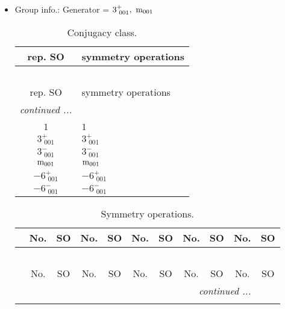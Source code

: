\documentclass[fleqn,10pt,landscape]{article}
\begin{document}
\begin{itemize}
\item Group info.: Generator = $3^{+}_{\,\,001},\,\,{\rm m}_{001}$

\begin{center}
\renewcommand{\arraystretch}{1.3}
\begin{longtable}{c|l}
\caption{Conjugacy class.}
 \\
 \hline \hline
rep. SO & symmetry operations \\ \hline \endfirsthead

\multicolumn{1}{l}{\tablename\ \thetable{}} \\
 \hline \hline
rep. SO & symmetry operations \\ \hline \endhead

 \hline \hline
\multicolumn{1}{r}{\footnotesize\it continued ...} \\ \endfoot

 \hline \hline
\multicolumn{1}{r}{} \\ \endlastfoot

$1$ & $1$ \\ \hline
$3^{+}_{\,\,001}$ & $3^{+}_{\,\,001}$ \\ \hline
$3^{-}_{\,\,001}$ & $3^{-}_{\,\,001}$ \\ \hline
${\rm m}_{001}$ & ${\rm m}_{001}$ \\ \hline
$-6^{+}_{\,\,001}$ & $-6^{+}_{\,\,001}$ \\ \hline
$-6^{-}_{\,\,001}$ & $-6^{-}_{\,\,001}$ \\
\end{longtable}
\end{center}
\begin{center}
\renewcommand{\arraystretch}{1.3}
\begin{longtable}{c|cc|cc|cc|cc|cc}
\caption{Symmetry operations.}
 \\
 \hline \hline
 & No. & SO & No. & SO & No. & SO & No. & SO & No. & SO \\ \hline \endfirsthead

\multicolumn{10}{l}{\tablename\ \thetable{}} \\
 \hline \hline
 & No. & SO & No. & SO & No. & SO & No. & SO & No. & SO \\ \hline \endhead

 \hline \hline
\multicolumn{10}{r}{\footnotesize\it continued ...} \\ \endfoot


\end{longtable}
\end{center}
\end{itemize}
\end{document}
